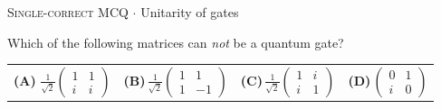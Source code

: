\documentclass[11pt,a4paper]{article}
\newcommand{\optlabel}[1]{\textbf{(#1)}}
\newcommand{\correctlabel}[1]{\textcolor{okgreen}{\textbf{(#1)}\,\ding{51}}}
\newenvironment{qitem}[1]{\begin{list}{}{\setlength{\leftmargin}{3.3em}\setlength{\labelwidth}{3.1em}%
  \setlength{\labelsep}{0.2em}\setlength{\topsep}{3pt}\setlength{\parsep}{3pt}}\item[\textbf{Q.#1}\hfill]}{\end{list}}
\newcommand{\qmeta}[2]{{\footnotesize\color{black!60}\textsc{#1} \;$\cdot$\; #2}\par}
\begin{document}
\begin{qitem}{30}
\qmeta{Single-correct MCQ}{Unitarity of gates}
Which of the following matrices can \emph{not} be a quantum gate?
\par\smallskip\noindent\begin{tabularx}{\linewidth}{@{}*{4}{L}@{}}
\correctlabel{A}\,$\frac{1}{\sqrt2}\begin{pmatrix}1&1\\ i&i\end{pmatrix}$ & \optlabel{B}\,$\frac{1}{\sqrt2}\begin{pmatrix}1&1\\ 1&-1\end{pmatrix}$ & \optlabel{C}\,$\frac{1}{\sqrt2}\begin{pmatrix}1&i\\ i&1\end{pmatrix}$ & \optlabel{D}\,$\begin{pmatrix}0&1\\ i&0\end{pmatrix}$
\end{tabularx}
\end{qitem}
\end{document}
